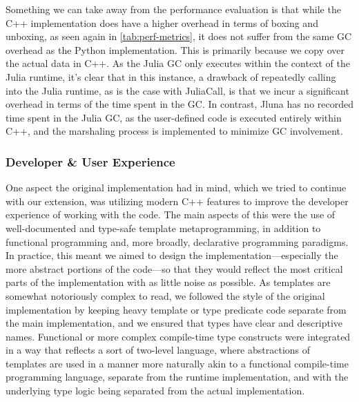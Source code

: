 Something we can take away from the performance evaluation is that while the C++ implementation does have a higher overhead in terms of boxing and unboxing, as seen again in \ref{tab:perf-metrics}, it does not suffer from the same GC overhead as the Python implementation. This is primarily because we copy over the actual data in C++. As the Julia GC only executes within the context of the Julia runtime, it's clear that in this instance, a drawback of repeatedly calling into the Julia runtime, as is the case with JuliaCall, is that we incur a significant overhead in terms of the time spent in the GC. In contrast, Jluna has no recorded time spent in the Julia GC, as the user-defined code is executed entirely within C++, and the marshaling process is implemented to minimize GC involvement. 

\subsubsection{Developer \& User Experience}

One aspect the original implementation had in mind, which we tried to continue with our extension, was utilizing modern C++ features to improve the developer experience of working with the code. The main aspects of this were the use of well-documented and type-safe template metaprogramming, in addition to functional programming and, more broadly, declarative programming paradigms. In practice, this meant we aimed to design the implementation—especially the more abstract portions of the code—so that they would reflect the most critical parts of the implementation with as little noise as possible. As templates are somewhat notoriously complex to read, we followed the style of the original implementation by keeping heavy template or type predicate code separate from the main implementation, and we ensured that types have clear and descriptive names. Functional or more complex compile-time type constructs were integrated in a way that reflects a sort of two-level language, where abstractions of templates are used in a manner more naturally akin to a functional compile-time programming language, separate from the runtime implementation, and with the underlying type logic being separated from the actual implementation.

